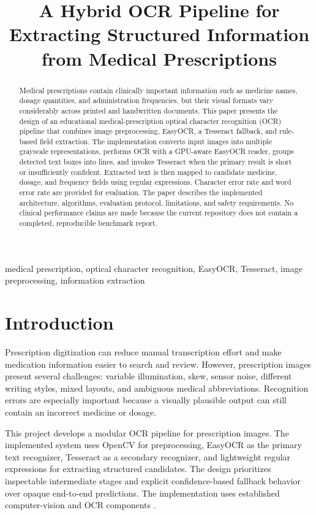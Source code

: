 \documentclass[conference]{IEEEtran}
\title{A Hybrid OCR Pipeline for Extracting Structured Information from Medical Prescriptions}
\author{
\IEEEauthorblockN{Medical Prescription OCR Research Team}
\IEEEauthorblockA{\textit{Medical Prescription OCR Project}\\
Educational Research Prototype}
\and
\IEEEauthorblockN{Sumit Mund}
\IEEEauthorblockA{\textit{Medical Prescription OCR Project}\\
Educational Research Prototype}
\and
\IEEEauthorblockN{Swapnaraj Mohanty}
\IEEEauthorblockA{\textit{Medical Prescription OCR Project}\\
Educational Research Prototype}
}
\begin{document}
\maketitle

\begin{abstract}
Medical prescriptions contain clinically important information such as medicine
names, dosage quantities, and administration frequencies, but their visual
formats vary considerably across printed and handwritten documents. This paper
presents the design of an educational medical-prescription optical character
recognition (OCR) pipeline that combines image preprocessing, EasyOCR, a
Tesseract fallback, and rule-based field extraction. The implementation converts
input images into multiple grayscale representations, performs OCR with a
GPU-aware EasyOCR reader, groups detected text boxes into lines, and invokes
Tesseract when the primary result is short or insufficiently confident. Extracted
text is then mapped to candidate medicine, dosage, and frequency fields using
regular expressions. Character error rate and word error rate are provided for
evaluation. The paper describes the implemented architecture, algorithms,
evaluation protocol, limitations, and safety requirements. No clinical
performance claims are made because the current repository does not contain a
completed, reproducible benchmark report.
\end{abstract}

\begin{IEEEkeywords}
medical prescription, optical character recognition, EasyOCR, Tesseract,
image preprocessing, information extraction
\end{IEEEkeywords}

\section{Introduction}
\label{sec:introduction}

Prescription digitization can reduce manual transcription effort and make
medication information easier to search and review. However, prescription
images present several challenges: variable illumination, skew, sensor noise,
different writing styles, mixed layouts, and ambiguous medical abbreviations.
Recognition errors are especially important because a visually plausible
output can still contain an incorrect medicine or dosage.

This project develops a modular OCR pipeline for prescription images. The
implemented system uses OpenCV for preprocessing, EasyOCR as the primary text
recognizer, Tesseract as a secondary recognizer, and lightweight regular
expressions for extracting structured candidates. The design prioritizes
inspectable intermediate stages and explicit confidence-based fallback behavior
over opaque end-to-end predictions. The implementation uses established
computer-vision and OCR components \cite{opencv,easyocr,tesseract}.
\end{document}
